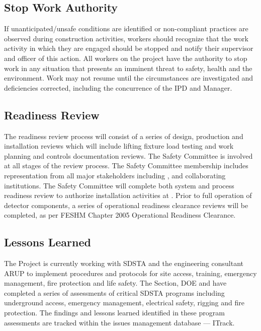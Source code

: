 \subsection{Stop Work Authority}

If unanticipated/unsafe conditions are identified or non-compliant
practices are observed during construction activities, workers should
recognize that the work activity in which they are engaged should be
stopped and notify their supervisor and  officer of
this action. All workers on the  project have the
authority to stop work in any situation that presents an imminent
threat to safety, health and the environment. Work may not resume
until the circumstances are investigated and deficiencies corrected,
including the concurrence of the  IPD 
and   Manager.

\subsection{ Readiness Review}

The  readiness review process will consist of a series of
design, production and installation reviews which will
include lifting fixture load testing and work planning and controls
documentation reviews. The  Safety Committee is involved at all stages of the review process. 
The  Safety Committee membership
includes representation from all major stakeholders including
\fnal, \surf and  collaborating institutions. The
 Safety Committee will complete both system and process
readiness review to authorize installation activities at \surf.  Prior
to full operation of detector components, a series of operational
readiness clearance reviews will be completed, as per FESHM Chapter
2005 Operational Readiness Clearance.

\subsection{Lessons Learned}

The  Project is currently working with SDSTA and the 
engineering consultant ARUP to implement  procedures and
protocols for site access, training, emergency management, fire
protection and life safety. The \fnal {} Section, DOE and
  have completed a series of assessments of
critical SDSTA  programs including underground access,
emergency management, electrical safety, rigging and fire
protection. The findings and lessons learned identified in these
 program assessments are tracked within the \fnal issues management
database --- ITrack.

